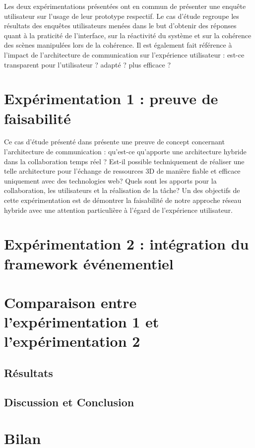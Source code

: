 Les deux expérimentations présentées ont en commun de présenter une enquête 
utilisateur sur l'usage de leur prototype respectif. Le cas d'étude regroupe les 
résultats des enquêtes utilisateurs menées dans le but d'obtenir des réponses 
quant à la praticité de l'interface, sur la réactivité du système et sur la 
cohérence des scènes manipulées lors de la cohérence. Il est également fait 
référence à l'impact de l'architecture de communication sur l'expérience utilisateur 
: est-ce transparent pour l'utilisateur ? adapté ? plus efficace ?




\section{Expérimentation 1 : preuve de faisabilité}

Ce cas d'étude présenté dans \cite{Desprat2015a, Desprat2015b} présente 
une preuve de concept concernant l'architecture de communication : qu'est-ce 
qu'apporte une architecture hybride dans la collaboration temps réel ? Est-il 
possible techniquement de réaliser une 
telle architecture pour l'échange de ressources 3D de manière fiable et efficace 
uniquement avec des technologies web? Quels sont les apports pour la 
collaboration, les utilisateurs et la réalisation de la tâche?
Un des objectifs de cette expérimentation est de démontrer la faisabilité de notre 
approche réseau hybride avec une attention particulière à l'égard de l'expérience 
utilisateur.



\section{Expérimentation 2 : intégration du framework événementiel}
\label{sec:us}






\section{Comparaison entre l'expérimentation 1 et l'expérimentation 2}
\subsection{Résultats}
\subsection{Discussion et Conclusion}
\section{Bilan}